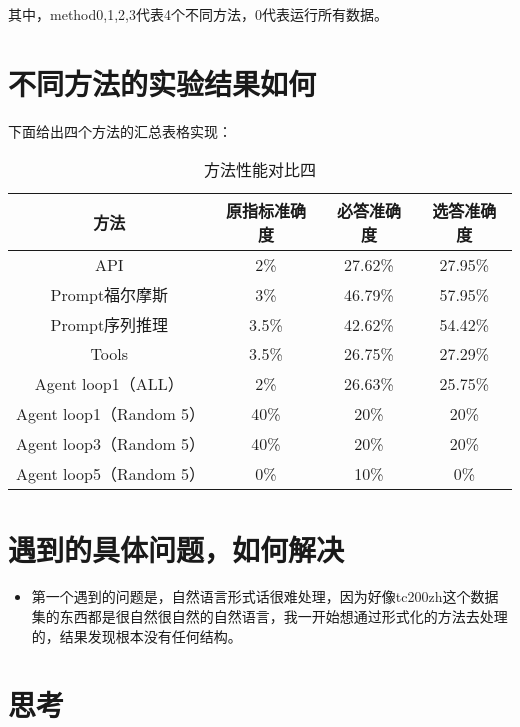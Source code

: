 \documentclass[answers]{exam}  %
\begin{document}
其中，method0,1,2,3代表4个不同方法，0代表运行所有数据。

\section{不同方法的实验结果如何}

下面给出四个方法的汇总表格实现：
\begin{table}[h]
    \centering
    \begin{tabular}{cccc}
    \toprule
    \textbf{方法} & \textbf{原指标准确度} & \textbf{必答准确度} &\textbf{选答准确度}\\
    \midrule
    API & 2\% & 27.62\% & 27.95\% \\
    \hline
    Prompt福尔摩斯 & 3\% & 46.79\% & 57.95\% \\
    \hline
    Prompt序列推理 & 3.5\% & 42.62\% & 54.42\% \\
    \hline
    Tools & 3.5\% & 26.75\% & 27.29\% \\
    \hline
    Agent loop1（ALL） & 2\% & 26.63\% & 25.75\% \\
    \hline
    \hline
    Agent loop1（Random 5） & 40\% & 20\% & 20\% \\
    \hline
    Agent loop3（Random 5） & 40\% & 20\% & 20\% \\
    \hline
    Agent loop5（Random 5） & 0\% & 10\% & 0\% \\
    \bottomrule
    \end{tabular}
    \caption{方法性能对比四}
\end{table}


\section{遇到的具体问题，如何解决}
\begin{itemize}
    \item 第一个遇到的问题是，自然语言形式话很难处理，因为好像tc200zh这个数据集的东西都是很自然很自然的自然语言，我一开始想通过形式化的方法去处理的，结果发现根本没有任何结构。
\end{itemize}

\section{思考}
\end{document}

